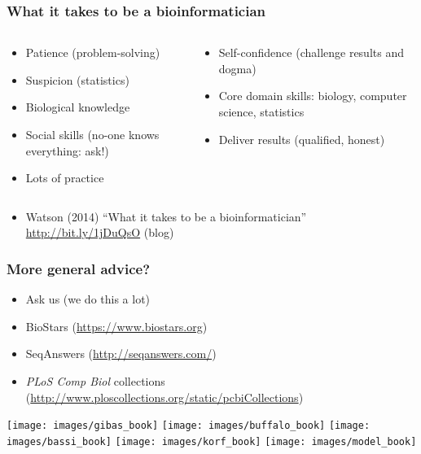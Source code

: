 \begin{frame}
  \frametitle{What it takes to be a bioinformatician}
  \begin{columns}[t]
    \begin{column}{5cm}
      \begin{itemize}
        \item Patience (problem-solving)
        \item Suspicion (statistics)
        \item Biological knowledge
        \item Social skills (no-one knows everything: ask!)
        \item Lots of practice          
      \end{itemize}
    \end{column}
    \begin{column}{5cm}
      \begin{itemize}
        \item Self-confidence (challenge results and dogma)
        \item Core domain skills: biology, computer science, statistics
        \item Deliver results (qualified, honest)
      \end{itemize}
    \end{column}
  \end{columns}
  \begin{itemize}
    \item Watson (2014) ``What it takes to be a bioinformatician'' \url{http://bit.ly/1jDuQsO} (blog)
  \end{itemize}
\end{frame}

\begin{frame}
  \frametitle{More general advice?}
  \begin{itemize}
    \item Ask us (we do this a lot)
    \item BioStars (\url{https://www.biostars.org})
    \item SeqAnswers (\url{http://seqanswers.com/})
    \item \textit{PLoS Comp Biol} collections (\url{http://www.ploscollections.org/static/pcbiCollections})
 \end{itemize}
 \texttt{[image: images/gibas\_book]}
 \texttt{[image: images/buffalo\_book]}
 \texttt{[image: images/bassi\_book]}
 \texttt{[image: images/korf\_book]}
 \texttt{[image: images/model\_book]}
\end{frame}
